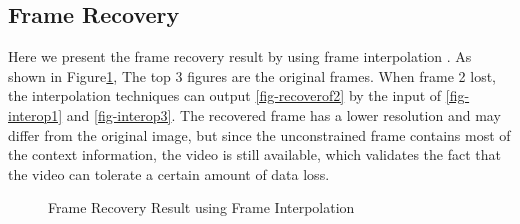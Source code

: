 \documentclass[sigconf]{acmart}
\begin{document}
\subsection{Frame Recovery}
Here we present the frame recovery result by using frame interpolation \cite{meyer2015phase, niklaus2018context,van2017frame}. As shown in Figure\ref{fig:frameRecovery}, The top 3 figures are the original frames. When frame 2 lost, the interpolation techniques can output \ref{fig-recoverof2} by the input of \ref{fig-interop1} and \ref{fig-interop3}. The recovered frame has a lower resolution and may differ from the original image, but since the unconstrained frame contains most of the context information, the video is still available, which validates the fact that the video can tolerate a certain amount of data loss.

\begin{figure}[ht]
\centering
{}

\caption{Frame Recovery Result using Frame Interpolation}
\label{fig:frameRecovery}
\end{figure}
\end{document}
